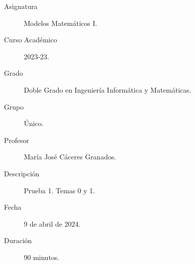 \documentclass[12pt]{article}
\begin{document}

    
    

    \begin{description}
        \item[Asignatura] Modelos Matemáticos I.
        \item[Curso Académico] 2023-23.
        \item[Grado] Doble Grado en Ingeniería Informática y Matemáticas.
        \item[Grupo] Único.
        \item[Profesor] María José Cáceres Granados.
        \item[Descripción] Prueba 1. Temas 0 y 1.
        \item[Fecha] 9 de abril de 2024.
        \item[Duración] 90 minutos.
    
    \end{description}
    \newpage
    
\end{document}

